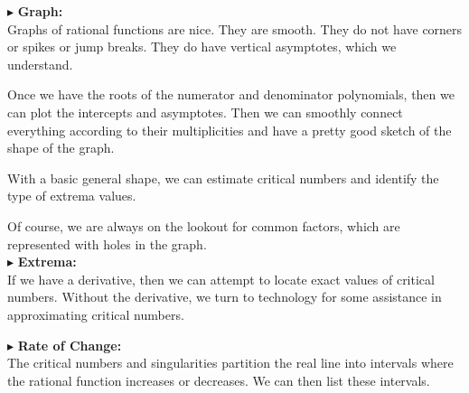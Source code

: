 \documentclass{ximera}
\begin{document}
$\blacktriangleright$ \textbf{\textcolor{red!10!blue!90!}{Graph:}} \\
Graphs of rational functions are nice.  They are smooth.  They do not have corners or spikes or jump breaks. They do have vertical asymptotes, which we understand.


Once we have the roots of the numerator and denominator polynomials, then we can plot the intercepts and asymptotes.  Then we can smoothly connect everything according to their multiplicities and have a pretty good sketch of the shape of the graph.

With a basic general shape, we can estimate critical numbers and identify the type of extrema values. 

Of course, we are always on the lookout for common factors, which are represented with holes in the graph. \\




$\blacktriangleright$ \textbf{\textcolor{red!10!blue!90!}{Extrema:}} \\
If we have a derivative, then we can attempt to locate exact values of critical numbers.  Without the derivative, we turn to technology for some assistance in approximating critical numbers.




$\blacktriangleright$ \textbf{\textcolor{red!10!blue!90!}{Rate of Change:}} \\
The critical numbers and singularities partition the real line into intervals where the rational function increases or decreases.  We can then list these intervals.
\end{document}
